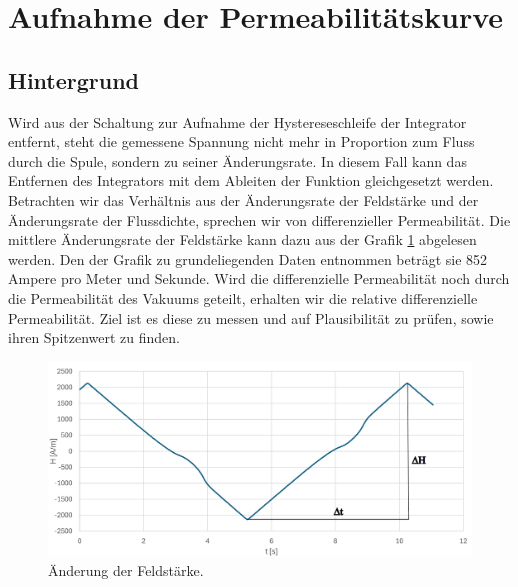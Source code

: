 \documentclass[a4paper,twoside,12pt,DIV=13,BCOR=5mm,numbers=noenddot,cleardoublepage=empty]{scrbook}
\begin{document}
        \section{Aufnahme der Permeabilit\"atskurve}
        \subsection{Hintergrund}
        Wird aus der Schaltung zur Aufnahme der Hystereseschleife der Integrator entfernt, steht die gemessene Spannung nicht mehr in Proportion 
        zum Fluss durch die Spule, sondern zu seiner \"Anderungsrate. In diesem Fall kann das Entfernen des Integrators mit dem Ableiten der Funktion
        gleichgesetzt werden. Betrachten wir das Verh\"altnis aus der \"Anderungsrate der Feldst\"arke und der \"Anderungsrate der Flussdichte, sprechen wir von 
        differenzieller Permeabilit\"at. Die mittlere \"Anderungsrate der Feldstärke kann dazu aus der Grafik \ref{fig:feld} abgelesen werden. Den der Grafik zu grundeliegenden Daten entnommen betr\"agt sie 852 Ampere pro Meter und Sekunde. Wird die differenzielle Permeabilit\"at noch durch die Permeabilit\"at des Vakuums geteilt, erhalten wir die relative differenzielle Permeabilit\"at. Ziel ist es diese zu messen 
        und auf Plausibilit\"at zu pr\"ufen, sowie ihren Spitzenwert zu finden.

        \begin{figure}
          \centering
          \includegraphics[width=0.9\linewidth]{pictures/Feld_Delta.png}
          \caption{\"Anderung der Feldst\"arke.}
          \label{fig:feld}
        \end{figure}
\end{document}
